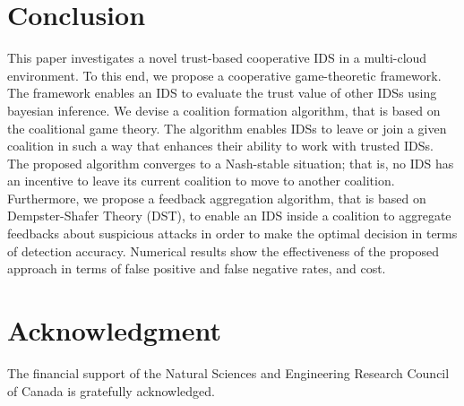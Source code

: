 \documentclass[conference]{IEEEtran}
\begin{document}
\section{Conclusion}

\label{sec:Conclusion}


This paper investigates a novel trust-based cooperative IDS in a multi-cloud environment. To this end, we propose a cooperative game-theoretic framework. The framework enables an IDS to evaluate the trust value of other IDSs using bayesian inference. We devise a coalition formation algorithm, that is based on the coalitional game theory. The algorithm enables IDSs to leave or join a given coalition in such a way that enhances their ability to work with trusted IDSs. The proposed algorithm converges to a Nash-stable situation; that is, no IDS has an incentive to leave its current coalition to move to another coalition. Furthermore, we propose a feedback aggregation algorithm, that is based on Dempster-Shafer Theory (DST), to enable an IDS inside a coalition to aggregate feedbacks about suspicious attacks in order to make the optimal decision in terms of detection accuracy. Numerical results show the effectiveness of the proposed approach in terms of false positive and false negative rates, and cost.

\section*{Acknowledgment}
The financial support of the Natural Sciences and Engineering
Research Council of Canada is gratefully acknowledged.




%
%
%

%
%





\end{document}

